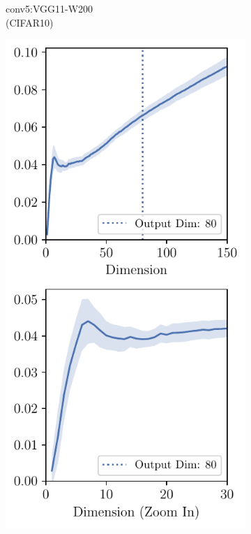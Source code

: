 \begin{figure}[h]
\begin{subfigure}[b]{0.23\textwidth}
        \caption{conv5:VGG11-W200\\(CIFAR10)}
        \label{fig:app_adexp_overlap_early_vgg_cifar10}
    \end{subfigure}
    \begin{subfigure}[b]{0.23\textwidth}
        \centering
        \captionsetup{justification=centering}
        \includegraphics[width=\textwidth]{Appendix_Figures/Overlap_large_model/FailCases/early/CIFAR100_VGG11W80New_nobn_fixlr0.01_conv2_zoom_stacked.pdf}

\end{subfigure}
\end{figure}
